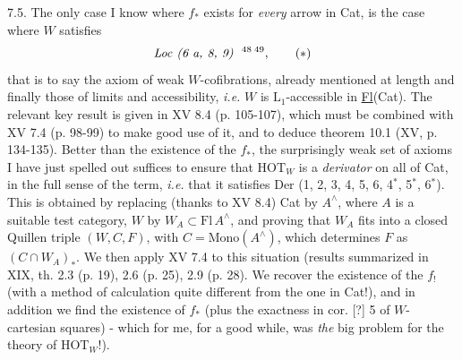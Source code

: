 7.5. The only case I know where $f_*$ exists for \textit{every} arrow in Cat, is the case where $W$ satisfies
\[
\textit{Loc (6 a, 8, 9)}\ \ \text{\footnotemark[48]\,\footnotemark[49]}, \tag*{$(*)$} %
\]
that is to say the axiom of weak $W$-cofibrations, already mentioned at length and finally those of limits and accessibility, \textit{i.e.} $W$ is $\mathrm{L}_1$-accessible in \underline{Fl}(Cat). The relevant key result is given in XV 8.4 (p. 105-107), which must be combined with XV 7.4 (p. 98-99) to make
good use of it, and to deduce theorem 10.1 (XV, p. 134-135). Better than the existence of the $f_*$, the surprisingly weak set of axioms I have just spelled out suffices to ensure that $\mathrm{HOT}_W$ is a \textit{derivator} on all of Cat, in the full sense of the term, \textit{i.e.} that it satisfies Der (1, 2, 3, 4, 5, 6, 4$^*$, 5$^*$, 6$^*$). This is obtained by replacing (thanks to XV 8.4) Cat by
$A^\wedge$, where $A$ is a suitable test category, $W$ by $W_A \subset \mathrm{Fl}\, A^\wedge$, and proving that $W_A$ fits into a closed Quillen triple $(W,C,F)$, with $C = \mathrm{Mono}(A^\wedge)$, which determines $F$ as $(C \cap W_A)_*$. We then apply XV 7.4 to this situation (results summarized in XIX, th. 2.3 (p. 19), 2.6 (p. 25), 2.9 (p. 28). We recover the existence of the $f_!$ (with a method of calculation quite different from the one in Cat!), and in addition we find the existence of $f_*$ (plus the exactness in cor. [?] 5
of $W$-cartesian squares) - which for me, for a good while, was \textit{the} big problem for the theory of $\mathrm{HOT}_W$!).

